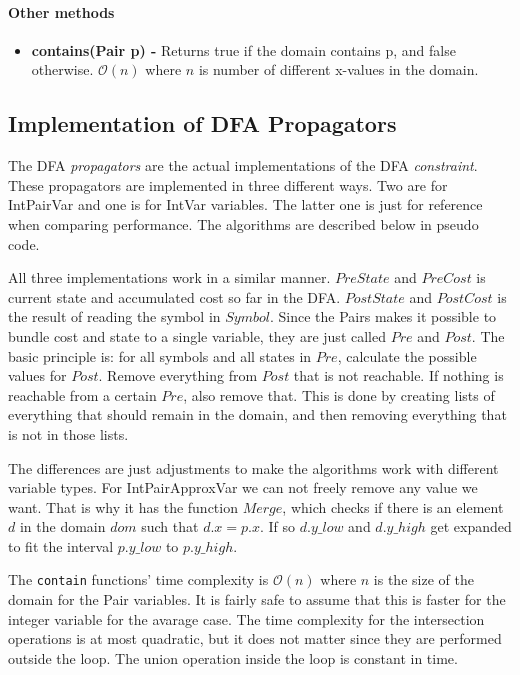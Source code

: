 \documentclass[a4paper,11pt]{article}
\begin{document}
\paragraph{Other methods}
\begin{itemize}
\item {\textbf{contains(Pair p) - }} Returns true if the domain contains p, and false otherwise. $\mathcal{O}(n)$ where $n$ is number of different x-values in the domain.
\end{itemize}

\subsection{Implementation of DFA Propagators}
The DFA \textit{propagators} are the actual implementations of the DFA \textit{constraint}. These propagators are implemented in three different ways. Two are for IntPairVar and one is for IntVar variables. The latter one is just for reference when comparing performance. The algorithms are described below in pseudo code.

All three implementations work in a similar manner. $PreState$ and $PreCost$ is current state and accumulated cost so far in the DFA. $PostState$ and $PostCost$ is the result of reading the symbol in $Symbol$. Since the Pairs makes it possible to bundle cost and state to a single variable, they are just called $Pre$ and $Post$. The basic principle is: for all symbols and all states in $Pre$, calculate the possible values for $Post$. Remove everything from $Post$ that is not reachable. If nothing is reachable from a certain $Pre$, also remove that. This is done by creating lists of everything that should remain in the domain, and then removing everything that is not in those lists.



The differences are just adjustments to make the algorithms work with different variable types. For IntPairApproxVar we can not freely remove any value we want. That is why it has the function $Merge$, which checks if there is an element $d$ in the domain $dom$ such that $d.x=p.x$. If so $d.y\_low$ and $d.y\_high$ get expanded to fit the interval $p.y\_low$ to $p.y\_high$. 

The \texttt{contain} functions' time complexity is $\mathcal{O}(n)$ where $n$ is the size of the domain for the Pair variables. It is fairly safe to assume that this is faster for the integer variable for the avarage case. The time complexity for the intersection operations is at most quadratic, but it does not matter since they are performed outside the loop. The union operation inside the loop is constant in time.
\end{document}
